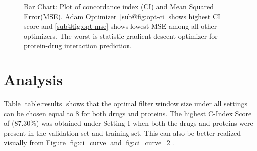 \begin{figure}[htbp]
    \quad
    \caption[Optimizer Chart: CI and MSE]{Bar Chart: Plot of concordance index (CI) and Mean Squared Error(MSE). Adam Optimizer~\ref{sub@fig:opt-ci} shows highest CI score and \ref{sub@fig:opt-mse} shows lowest MSE among all other optimizers. The worst is statistic gradient descent optimizer for protein-drug interaction prediction.}
    \label{fig:optimizer_plot}
\end{figure}


\section{Analysis}
Table \ref{table:results} shows that the optimal filter window size under all settings can be chosen equal to 8 for both drugs and proteins. The highest C-Index Score of (87.30\%) was obtained under Setting 1 when both the drugs and proteins were present in the validation set and training set. This can also be better realized visually from Figure \ref{fig:ci_curve} and \ref{fig:ci_curve_2}.
 

